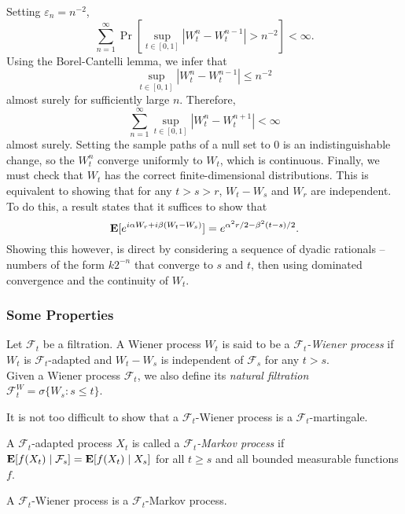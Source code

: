 Setting $\varepsilon_n = n^{-2}$,
\[ \sum_{n=1}^\infty \Pr\left[\sup_{t\in[0,1]} |W_t^n - W_t^{n-1}| > n^{-2} \right] < \infty. \]
Using the Borel-Cantelli lemma, we infer that
\[ \sup_{t\in[0,1]} |W_t^n - W_t^{n-1}| \leq n^{-2} \]
almost surely for sufficiently large $n$. Therefore,
\[ \sum_{n=1}^\infty \sup_{t\in[0,1]} |W_t^n - W_t^{n+1}| < \infty \]
almost surely. Setting the sample paths of a null set to $0$ is an indistinguishable change, so the $W_t^n$ converge uniformly to $W_t$, which is continuous. Finally, we must check that $W_t$ has the correct finite-dimensional distributions. This is equivalent to showing that for any $t>s>r$, $W_t-W_s$ and $W_r$ are independent.\\
To do this, a result states that it suffices to show that
\[ \textbf{E}[e^{i\alpha W_r + i\beta(W_t-W_s)}] = e^{\alpha^2r/2 - \beta^2(t-s)/2}. \]
Showing this however, is direct by considering a sequence of dyadic rationals -- numbers of the form $k2^{-n}$ that converge to $s$ and $t$, then using dominated convergence and the continuity of $W_t$.

\subsubsection{Some Properties}

\begin{definition}
	Let $\mathcal{F}_t$ be a filtration. A Wiener process $W_t$ is said to be a \textit{$\mathcal{F}_t$-Wiener process} if $W_t$ is $\mathcal{F}_t$-adapted and $W_t-W_s$ is independent of $\mathcal{F}_s$ for any $t>s$.\\
	Given a Wiener process $\mathcal{F}_t$, we also define its \textit{natural filtration} $\mathcal{F}_t^W = \sigma\{W_s : s\leq t\}$.
\end{definition}

It is not too difficult to show that a $\mathcal{F}_t$-Wiener process is a $\mathcal{F}_t$-martingale.

\begin{definition}
	A $\mathcal{F}_t$-adapted process $X_t$ is called a \textit{$\mathcal{F}_t$-Markov process} if $\textbf{E}[f(X_t)\mid\mathcal{F}_s] = \textbf{E}[f(X_t)\mid X_s]$ for all $t\geq s$ and all bounded measurable functions $f$.
\end{definition}

\begin{lemma}
	A $\mathcal{F}_t$-Wiener process is a $\mathcal{F}_t$-Markov process.
\end{lemma}

